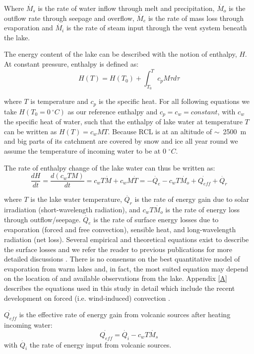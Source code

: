 \documentclass{bmcart}
\begin{document}
Where $\dot{M_s}$ is the rate of water inflow through melt and precipitation,
$\dot{M_o}$
is the outflow rate through seepage and overflow, $\dot{M_e}$ is the rate of mass
loss through evaporation and $\dot{M_i}$ is the rate of steam input through the vent
system beneath the lake.

The energy content of the lake can be described with the notion of
enthalpy, $H$. At constant pressure, enthalpy is defined as:
\begin{equation}
	H(T) = H(T_0) + \int_{T_0}^{T}c_pM\tau d\tau
\end{equation}

where $T$ is temperature and $c_p$ is the specific heat. For all following
equations we take $H(T_0=0~^{\circ}C)$ as our reference enthalpy and
$c_p=c_w=constant$, with $c_w$ the specific heat of water, such that the
enthalpy of lake water at temperature $T$ can be written as $H(T) = c_wMT$.
Because RCL is at an altitude of $\sim$~2500~m and big parts of its catchment
are covered by snow and ice all year round we assume the temperature of incoming
water to be at 0 $^{\circ}C$.

The rate of enthalpy change of the lake water can thus be written as:
\begin{equation}\label{ode_E}
    \frac{dH}{dt}=\frac{d(c_wTM)}{dt}=c_wT\dot{M} + c_wM\dot{T} =
	-\dot{Q_e} - c_wT\dot{M_o} + \dot{Q_{eff}} + \dot{Q_r}
\end{equation}
      
where $T$ is the lake water temperature, $\dot{Q_r}$ is the rate of energy gain
due to solar irradiation (short-wavelength radiation), and $c_wT\dot{M_o}$ is
the rate of energy loss through outflow/seepage. $\dot{Q_e}$ is the rate of
surface energy losses due to evaporation (forced and free convection), sensible
heat, and long-wavelength radiation (net loss). Several empirical and
theoretical equations exist to describe the surface losses and we refer the
reader to previous publications for more detailed discussions
\cite{Stevenson1992, hurstCraterLakeEnergy2015}. There is no consensus on the
best quantitative model of evaporation from warm lakes and, in fact, the most
suited equation may depend on the location of and available observations from
the lake. Appendix \ref{A} describes the equations used in this study in detail
which include the recent development on forced (i.e. wind-induced) convection
\cite{sartoriCriticalReviewEquations2000}. 

$\dot{Q_{eff}}$ is the effective rate of energy gain from volcanic sources after
heating incoming water:
\begin{equation}
	\dot{Q_{eff}}=\dot{Q_i} - c_wT\dot{M_s}
\end{equation}
with $\dot{Q_i}$ the rate of energy input from volcanic sources.
\end{document}
